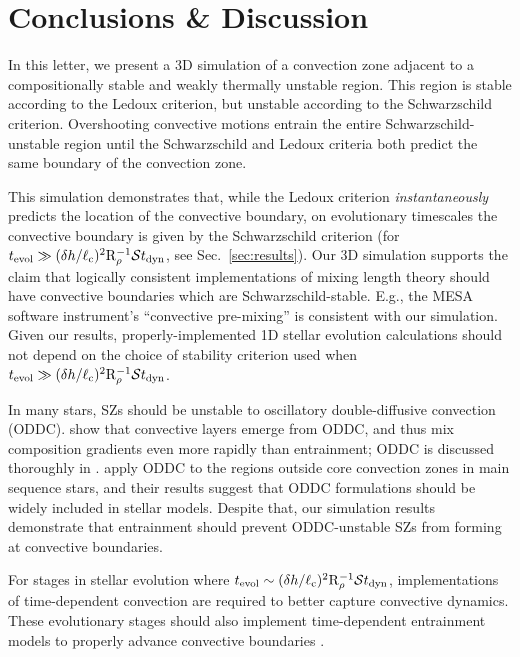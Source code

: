 \section{Conclusions \& Discussion}
\label{sec:conclusions}

In this letter, we present a 3D simulation of a convection zone adjacent to a compositionally stable and weakly thermally unstable region.
This region is stable according to the Ledoux criterion, but unstable according to the Schwarzschild criterion.
Overshooting convective motions entrain the entire Schwarzschild-unstable region until the Schwarzschild and Ledoux criteria both predict the same boundary of the convection zone.

This simulation demonstrates that, while the Ledoux criterion \emph{instantaneously} predicts the location of the convective boundary, on evolutionary timescales the convective boundary is given by the Schwarzschild criterion (for $t_{\rm{evol}} \gg (\delta h / \ell_{\rm{c}})^2\mathrm{R}_{\rho}^{-1}\mathcal{S} t_{\rm{dyn}}$, see Sec.~\ref{sec:results}).
Our 3D simulation supports the claim that logically consistent implementations of mixing length theory \citep{gabriel_etal_2014, mesa4, mesa5} should have convective boundaries which are Schwarzschild-stable.
E.g., the MESA software instrument's ``convective pre-mixing'' \citep[CPM,][]{mesa5} is consistent with our simulation.
Given our results, properly-implemented 1D stellar evolution calculations should not depend on the choice of stability criterion used when $t_{\rm{evol}} \gg (\delta h / \ell_{\rm{c}})^2\mathrm{R}_{\rho}^{-1}\mathcal{S} t_{\rm{dyn}}$.

In many stars, SZs should be unstable to oscillatory double-diffusive convection (ODDC).
\citet{mirouh_etal_2012} show that convective layers emerge from ODDC, and thus mix composition gradients even more rapidly than entrainment; ODDC is discussed thoroughly in \citet{garaud_2018}.
\citet{moore_garaud_2016} apply ODDC to the regions outside core convection zones in main sequence stars, and their results suggest that ODDC formulations should be widely included in stellar models.
Despite that, our simulation results demonstrate that entrainment should prevent ODDC-unstable SZs from forming at convective boundaries.

For stages in stellar evolution where ${t_{\rm{evol}} \sim (\delta h / \ell_{\rm{c}})^2\mathrm{R}_{\rho}^{-1}\mathcal{S} t_{\rm{dyn}}}$, implementations of time-dependent convection \citep[TDC,][]{tdc_1986} are required to better capture convective dynamics.
These evolutionary stages should also implement time-dependent entrainment models to properly advance convective boundaries \citep[e.g.,][]{turner_1968, fuentes_cumming_2020}.

